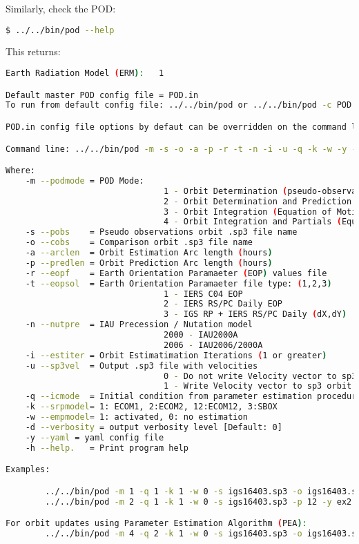 Similarly, check the POD:

\begin{lstlisting}[language=bash]
$ ../../bin/pod --help
\end{lstlisting}

This returns:

\begin{lstlisting}[language=bash]
Earth Radiation Model (ERM):   1

Default master POD config file = POD.in
To run from default config file: ../../bin/pod or ../../bin/pod -c POD.in

POD.in config file options by defaut can be overridden on the command line

Command line: ../../bin/pod -m -s -o -a -p -r -t -n -i -u -q -k -w -y -h 

Where: 
    -m --podmode = POD Mode:
                                1 - Orbit Determination (pseudo-observations; orbit fitting)
                                2 - Orbit Determination and Prediction
                                3 - Orbit Integration (Equation of Motion only)
                                4 - Orbit Integration and Partials (Equation of Motion and Variational Equations)
    -s --pobs    = Pseudo observations orbit .sp3 file name
    -o --cobs    = Comparison orbit .sp3 file name
    -a --arclen  = Orbit Estimation Arc length (hours)
    -p --predlen = Orbit Prediction Arc length (hours)
    -r --eopf    = Earth Orientation Paramaeter (EOP) values file
    -t --eopsol  = Earth Orientation Paramaeter file type: (1,2,3)
                                1 - IERS C04 EOP
                                2 - IERS RS/PC Daily EOP
                                3 - IGS RP + IERS RS/PC Daily (dX,dY)
    -n --nutpre  = IAU Precession / Nutation model
                                2000 - IAU2000A
                                2006 - IAU2006/2000A
    -i --estiter = Orbit Estimatimation Iterations (1 or greater)
    -u --sp3vel  = Output .sp3 file with velocities
                                0 - Do not write Velocity vector to sp3 orbit
                                1 - Write Velocity vector to sp3 orbit
    -q --icmode  = Initial condition from parameter estimation procedure
    -k --srpmodel= 1: ECOM1, 2:ECOM2, 12:ECOM12, 3:SBOX
    -w --empmodel= 1: activated, 0: no estimation
    -d --verbosity = output verbosity level [Default: 0]
    -y --yaml = yaml config file
    -h --help.   = Print program help

Examples:

        ../../bin/pod -m 1 -q 1 -k 1 -w 0 -s igs16403.sp3 -o igs16403.sp3 -y ex1.yaml
        ../../bin/pod -m 2 -q 1 -k 1 -w 0 -s igs16403.sp3 -p 12 -y ex2.yaml

For orbit updates using Parameter Estimation Algorithm (PEA):
        ../../bin/pod -m 4 -q 2 -k 1 -w 0 -s igs16403.sp3 -o igs16403.sp3 -y ex3.yaml
\end{lstlisting}


